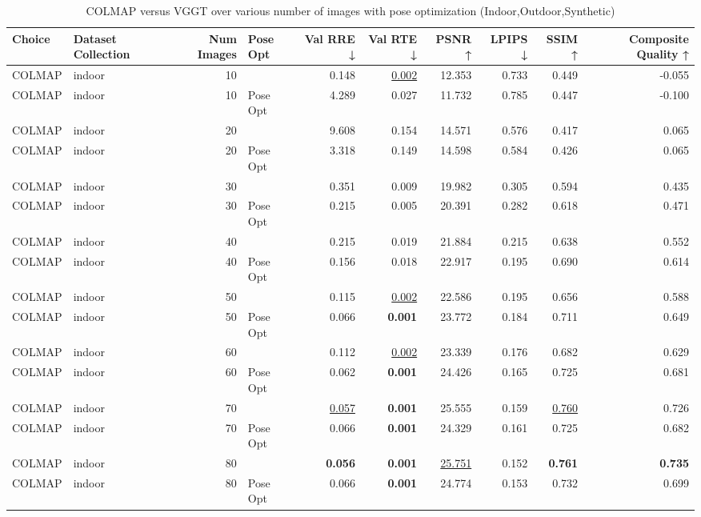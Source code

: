 \begin{table}[H]
\caption{\ifdefined\customcaption \customcaption \else COLMAP versus VGGT over various number of images with pose optimization (Indoor,Outdoor,Synthetic) \fi}
\label{tab:01_num_images_pose_opt_indoor,outdoor,synthetic}
\centering
\scriptsize
\begin{tabular}{llrlrrrrrr}
\toprule
Choice & Dataset Collection & Num Images & Pose Opt & Val RRE ↓ & Val RTE ↓ & PSNR ↑ & LPIPS ↓ & SSIM ↑ & Composite Quality ↑ \\
\midrule
COLMAP & indoor & 10 &  & 0.148 & \underline{0.002} & 12.353 & 0.733 & 0.449 & -0.055 \\
COLMAP & indoor & 10 & Pose Opt & 4.289 & 0.027 & 11.732 & 0.785 & 0.447 & -0.100 \\
COLMAP & indoor & 20 &  & 9.608 & 0.154 & 14.571 & 0.576 & 0.417 & 0.065 \\
COLMAP & indoor & 20 & Pose Opt & 3.318 & 0.149 & 14.598 & 0.584 & 0.426 & 0.065 \\
COLMAP & indoor & 30 &  & 0.351 & 0.009 & 19.982 & 0.305 & 0.594 & 0.435 \\
COLMAP & indoor & 30 & Pose Opt & 0.215 & 0.005 & 20.391 & 0.282 & 0.618 & 0.471 \\
COLMAP & indoor & 40 &  & 0.215 & 0.019 & 21.884 & 0.215 & 0.638 & 0.552 \\
COLMAP & indoor & 40 & Pose Opt & 0.156 & 0.018 & 22.917 & 0.195 & 0.690 & 0.614 \\
COLMAP & indoor & 50 &  & 0.115 & \underline{0.002} & 22.586 & 0.195 & 0.656 & 0.588 \\
COLMAP & indoor & 50 & Pose Opt & 0.066 & \textbf{0.001} & 23.772 & 0.184 & 0.711 & 0.649 \\
COLMAP & indoor & 60 &  & 0.112 & \underline{0.002} & 23.339 & 0.176 & 0.682 & 0.629 \\
COLMAP & indoor & 60 & Pose Opt & 0.062 & \textbf{0.001} & 24.426 & 0.165 & 0.725 & 0.681 \\
COLMAP & indoor & 70 &  & \underline{0.057} & \textbf{0.001} & 25.555 & 0.159 & \underline{0.760} & 0.726 \\
COLMAP & indoor & 70 & Pose Opt & 0.066 & \textbf{0.001} & 24.329 & 0.161 & 0.725 & 0.682 \\
COLMAP & indoor & 80 &  & \textbf{0.056} & \textbf{0.001} & \underline{25.751} & 0.152 & \textbf{0.761} & \textbf{0.735} \\
COLMAP & indoor & 80 & Pose Opt & 0.066 & \textbf{0.001} & 24.774 & 0.153 & 0.732 & 0.699 \\

\end{tabular}
\end{table}
